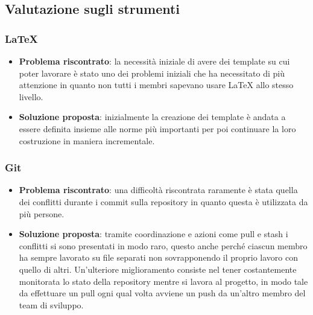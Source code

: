 	\subsection{Valutazione sugli strumenti}

		\subsubsection{\LaTeX}
			\begin{itemize}
				\item \textbf{Problema riscontrato}: la necessità iniziale di avere dei template su cui poter lavorare è stato uno dei problemi iniziali che ha necessitato di più attenzione in quanto non tutti i membri sapevano usare {\LaTeX} allo stesso livello.
				\item \textbf{Soluzione proposta}: inizialmente la creazione dei template è andata a essere definita insieme alle norme più importanti per poi continuare la loro costruzione in maniera incrementale.
			\end{itemize}
		
		\subsubsection{Git}
			\begin{itemize}
				\item \textbf{Problema riscontrato}: una difficoltà riscontrata raramente è stata quella dei conflitti durante i commit sulla repository in quanto questa è utilizzata da più persone.
				\item \textbf{Soluzione proposta}: tramite coordinazione e azioni come pull e stash i conflitti si sono presentati in modo raro, questo anche perché ciascun membro ha sempre lavorato su file separati non sovrapponendo il proprio lavoro con quello di altri. Un'ulteriore miglioramento consiste nel tener costantemente monitorata lo stato della repository mentre si lavora al progetto, in modo tale da effettuare un pull ogni qual volta avviene un push da un'altro membro del team di sviluppo. 
			\end{itemize}
		
